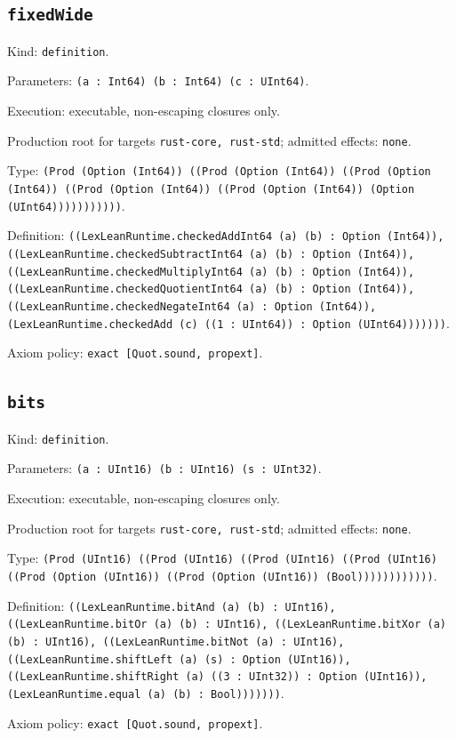 \documentclass[11pt]{article}
\begin{document}
\subsection*{\texttt{fixedWide}}
\noindent Kind: \texttt{definition}.\par
\noindent Parameters: \texttt{(a : Int64) (b : Int64) (c : UInt64)}.\par
\noindent Execution: executable, non-escaping closures only.\par
\noindent Production root for targets \texttt{rust-core, rust-std}; admitted effects: \texttt{none}.\par
\noindent Type: \texttt{(Prod (Option (Int64)) ((Prod (Option (Int64)) ((Prod (Option (Int64)) ((Prod (Option (Int64)) ((Prod (Option (Int64)) (Option (UInt64)))))))))))}.\par
\noindent Definition: \texttt{((LexLeanRuntime.checkedAddInt64 (a) (b) : Option (Int64)), ((LexLeanRuntime.checkedSubtractInt64 (a) (b) : Option (Int64)), ((LexLeanRuntime.checkedMultiplyInt64 (a) (b) : Option (Int64)), ((LexLeanRuntime.checkedQuotientInt64 (a) (b) : Option (Int64)), ((LexLeanRuntime.checkedNegateInt64 (a) : Option (Int64)), (LexLeanRuntime.checkedAdd (c) ((1 : UInt64)) : Option (UInt64)))))))}.\par
\noindent Axiom policy: \texttt{exact [Quot.sound, propext]}.\par
\subsection*{\texttt{bits}}
\noindent Kind: \texttt{definition}.\par
\noindent Parameters: \texttt{(a : UInt16) (b : UInt16) (s : UInt32)}.\par
\noindent Execution: executable, non-escaping closures only.\par
\noindent Production root for targets \texttt{rust-core, rust-std}; admitted effects: \texttt{none}.\par
\noindent Type: \texttt{(Prod (UInt16) ((Prod (UInt16) ((Prod (UInt16) ((Prod (UInt16) ((Prod (Option (UInt16)) ((Prod (Option (UInt16)) (Bool))))))))))))}.\par
\noindent Definition: \texttt{((LexLeanRuntime.bitAnd (a) (b) : UInt16), ((LexLeanRuntime.bitOr (a) (b) : UInt16), ((LexLeanRuntime.bitXor (a) (b) : UInt16), ((LexLeanRuntime.bitNot (a) : UInt16), ((LexLeanRuntime.shiftLeft (a) (s) : Option (UInt16)), ((LexLeanRuntime.shiftRight (a) ((3 : UInt32)) : Option (UInt16)), (LexLeanRuntime.equal (a) (b) : Bool)))))))}.\par
\noindent Axiom policy: \texttt{exact [Quot.sound, propext]}.\par
\end{document}
